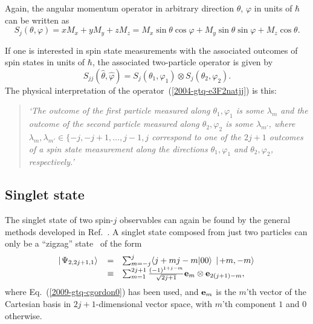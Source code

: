 \documentclass[pra,amsfonts,showpacs,showkeys,preprint]{revtex4}
\begin{document}
Again, the angular momentum operator in arbitrary direction $\theta$, $\varphi$ in units of $\hbar$ can be written as
\begin{equation}
S_j (\theta ,\varphi) =
xM_x
+
yM_y
+
zM_z
=
 M_x  \sin \theta \cos \varphi
+
M_y   \sin \theta \sin \varphi
+
M_z   \cos \theta
.
\label{e-2009-gtq-sjj}
\end{equation}


If one is interested in spin state measurements with the associated outcomes of spin states in units of $\hbar$,
the associated two-particle operator is given by
\begin{equation}
 S_{j j } ({\hat \theta},{\hat \varphi} ) =
S_{j }( \theta_1,\varphi_1 )
\otimes
S_{j }( \theta_2,\varphi_2 ).
\label{2004-gtq-e3F2natjj}
\end{equation}
The physical interpretation of the operator~(\ref{2004-gtq-e3F2natjj}) is this:
\begin{quote}
{\em `The outcome of the first particle measured along $\theta_1,\varphi_1$ is some $\lambda_{m}$
      and
      the outcome of the second particle measured along $\theta_2,\varphi_2$ is some $\lambda_{m'}$,
      where  $\lambda_{m}, \lambda_{m'}\in \{-j,-j+1,\ldots ,j-1,j$ correspond to one of the $2j+1$ outcomes of a spin state measurement
      along the directions $\theta_1,\varphi_1$ and $\theta_2,\varphi_2$, respectively.'
}
\end{quote}


\subsection{Singlet state}

The singlet state of two spin-$j$ observables
can again be found by the general methods developed in Ref.~\cite{schimpf-svozil}.
A singlet state composed from just two particles can only be a ``zigzag'' state~\cite{schimpf-svozil}
of the form
\begin{equation}
\begin{array}{rcl}
\left|  \left. \Psi_{2,2j+1,1} \right\rangle  \right.
&=&
\sum_{m=-j}^{j}
\langle j+mj-m\vert 00\rangle
\;
\left| \left. +m ,-m \right\rangle \right. \\
&\equiv &
\sum_{m=1}^{2j+1}
\frac{(-1)^{1+j-m}}{\sqrt{2j+1}}
{\bf e}_m \otimes {\bf e}_{2(j+1)-m}
,
\end{array}
\label{e-2009-gtq-zz}
\end{equation}
where Eq.~(\ref{2009-gtq-cgordon0}) has been used,
and ${\bf e}_m$ is the $m$'th vector of the Cartesian basis in $2j+1$-dimensional
vector space, with $m$'th component $1$ and $0$ otherwise.
\end{document}
